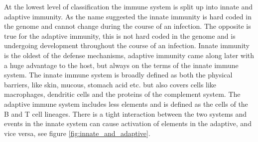 At the lowest level of classification the immune system is split up into innate and adaptive immunity.
As the name suggested the innate immunity is hard coded in the genome and cannot change during the course of an infection.
The opposite is true for the adaptive immunity, this is not hard coded in the genome and is undergoing development throughout the course of an infection.
Innate immunity is the oldest of the defense mechanisms, adaptive immunity came along later with a huge advantage to the host, but always on the terms of the innate immune system.
The innate immune system is broadly defined as both the physical barriers, like skin, mucous, stomach acid etc. but also covers cells like macrophages, dendritic cells and the proteins of the complement system.
The adaptive immune system includes less elements and is defined as the cells of the B and T cell lineages.
There is a tight interaction between the two systems and events in the innate system can cause activation of elements in the adaptive, and vice versa, see figure \ref{fig:innate_and_adaptive}.

